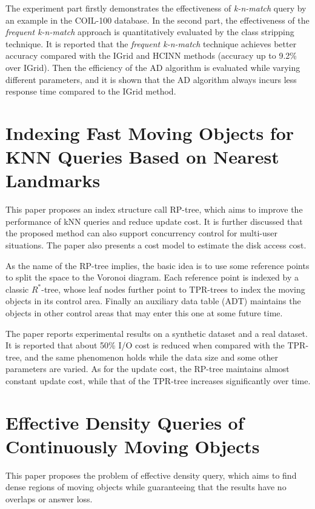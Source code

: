 \documentclass[paper=a4, fontsize=18pt]{article} %
\numberwithin{equation}{section} %
\numberwithin{figure}{section} %
\numberwithin{table}{section} %
\begin{document}
The experiment part firstly demonstrates the effectiveness of \emph{k-n-match} query by an example in the COIL-100 database. In the second part, the effectiveness of the \emph{frequent k-n-match} approach is quantitatively evaluated by the class stripping technique. It is reported that the \emph{frequent k-n-match} technique achieves better accuracy compared with the IGrid and HCINN methods (accuracy up to 9.2\% over IGrid). Then the efficiency of the AD algorithm is evaluated while varying different parameters, and it is shown that the AD algorithm always incurs less response time compared to the IGrid method.

\section{Indexing Fast Moving Objects for KNN Queries Based on Nearest Landmarks \cite{LZZ06}}

This paper proposes an index structure call RP-tree, which aims to improve the performance of kNN queries and reduce update cost. It is further discussed that the proposed method can also support concurrency control for multi-user situations. The paper also presents a cost model to estimate the disk access cost.

As the name of the RP-tree implies, the basic idea is to use some reference points to split the space to the Voronoi diagram. Each reference point is indexed by a classic $R^*$-tree, whose leaf nodes further point to TPR-trees \cite{SJLL00} to index the moving objects in its control area. Finally an auxiliary data table (ADT) maintains the objects in other control areas that may enter this one at some future time.

The paper reports experimental results on a synthetic dataset and a real dataset. It is reported that about 50\% I/O cost is reduced when compared with the TPR-tree, and the same phenomenon holds while the data size and some other parameters are varied. As for the update cost, the RP-tree maintains almost constant update cost, while that of the TPR-tree increases significantly over time.

\section{Effective Density Queries of Continuously Moving Objects \cite{JLOZ06}}

This paper proposes the problem of effective density query, which aims to find dense regions of moving objects while guaranteeing that the results have no overlaps or answer loss.
\end{document}
